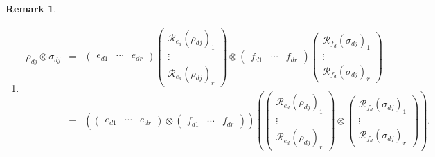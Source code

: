 \documentclass[aps,preprint]{revtex4}
\newtheorem{remark}[theorem]{Remark}
\begin{document}
\begin{remark}
\begin{enumerate}
\begin{enumerate}
\item 
\begin{eqnarray}
\rho _{dj}\otimes \sigma _{dj} &=&\left( 
\begin{array}{ccc}
e_{d1} & \cdots & e_{dr}%
\end{array}%
\right) \left( 
\begin{array}{c}
\mathcal{R}_{e_{d}}\left( \rho _{dj}\right) _{1} \\ 
\vdots \\ 
\mathcal{R}_{e_{d}}\left( \rho _{dj}\right) _{r}%
\end{array}%
\right) \otimes \left( 
\begin{array}{ccc}
f_{d1} & \cdots & f_{dr}%
\end{array}%
\right) \left( 
\begin{array}{c}
\mathcal{R}_{f_{d}}\left( \sigma _{dj}\right) _{1} \\ 
\vdots \\ 
\mathcal{R}_{f_{d}}\left( \sigma _{dj}\right) _{r}%
\end{array}%
\right) \\
&=&\left( \overset{}{\left( 
\begin{array}{ccc}
e_{d1} & \cdots & e_{dr}%
\end{array}%
\right) \otimes \left( 
\begin{array}{ccc}
f_{d1} & \cdots & f_{dr}%
\end{array}%
\right) }\right) \left( \left( 
\begin{array}{c}
\mathcal{R}_{e_{d}}\left( \rho _{dj}\right) _{1} \\ 
\vdots \\ 
\mathcal{R}_{e_{d}}\left( \rho _{dj}\right) _{r}%
\end{array}%
\right) \otimes \left( 
\begin{array}{c}
\mathcal{R}_{f_{d}}\left( \sigma _{dj}\right) _{1} \\ 
\vdots \\ 
\mathcal{R}_{f_{d}}\left( \sigma _{dj}\right) _{r}%
\end{array}%
\right) \right) .
\end{eqnarray}


\end{enumerate}
\end{enumerate}
\end{remark}
\end{document}
